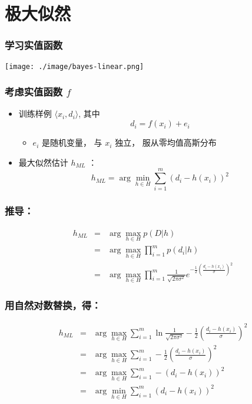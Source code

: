 \documentclass{beamer}
\begin{document}
\section{极大似然}
\label{sec-3}
\begin{frame}
\frametitle{学习实值函数}
\label{sec-3-1}

\texttt{[image: ./image/bayes-linear.png]}
\end{frame}
\begin{frame}
\frametitle{考虑实值函数 $f$}
\label{sec-3-2}

\begin{itemize}
\item 训练样例 $\langle x_{i}, d_{i} \rangle$, 其中
   $$d_{i} = f(x_{i}) + e_{i}$$
\begin{itemize}
\item $e_{i}$ 是随机变量， 与 $x_{i}$ 独立， 服从零均值高斯分布
\end{itemize}
\item 最大似然估计 $h_{ML}$ ：
  $$h_{ML} = \arg \min_{h \in H} \sum_{i=1}^{m} \left(d_{i} -h(x_{i})\right)^{2}$$
\end{itemize}
\end{frame}
\begin{frame}
\frametitle{推导：}
\label{sec-3-3}


\begin{eqnarray}
h_{ML} &= &\arg \max_{h \in H} p(D|h) \nonumber \\
 &= &\arg \max_{h \in H} \prod_{i=1}^{m} p(d_{i}|h) \nonumber \\
&= &\arg \max_{h \in H} \prod_{i=1}^{m} \frac{1}{\sqrt{2 \pi \sigma^{2}}}
e^{-\frac{1}{2}(\frac{d_{i} - h(x_{i})}{\sigma})^{2}} \nonumber
\end{eqnarray}
\end{frame}
\begin{frame}
\frametitle{用自然对数替换，得：}
\label{sec-3-4}


\begin{eqnarray}
h_{ML}  &= &\arg \max_{h \in H}
\sum_{i=1}^{m} \ln \frac{1}{\sqrt{2 \pi \sigma^{2}}} -
\frac{1}{2}\left(\frac{d_{i} - h(x_{i})}{\sigma}\right)^{2} \nonumber \\
  &= &\arg \max_{h \in H} \sum_{i=1}^{m} -
\frac{1}{2}\left(\frac{d_{i} - h(x_{i})}{\sigma}\right)^{2} \nonumber \\
 &= &\arg \max_{h \in H} \sum_{i=1}^{m} - \left(d_{i} - h(x_{i})\right)^{2}
 \nonumber \\
 &= &\arg \min_{h \in H} \sum_{i=1}^{m} \left(d_{i} - h(x_{i})\right)^{2}  \nonumber
\end{eqnarray}
\end{frame}
\end{document}
